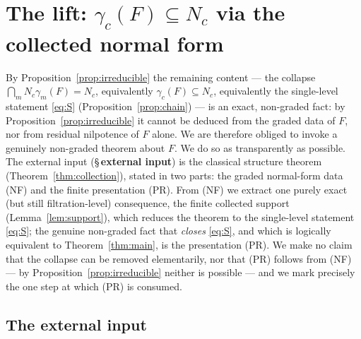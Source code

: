 \documentclass{amsart}
\theoremstyle{definition}
\theoremstyle{remark}
\begin{document}
\section{The lift: $\gamma_c(F)\subseteq N_c$ via the collected normal form}
\label{sec:lift}

By Proposition~\ref{prop:irreducible} the remaining content --- the collapse
$\bigcap_m N_c\gamma_m(F)=N_c$, equivalently $\gamma_c(F)\subseteq N_c$, equivalently the
single-level statement \eqref{eq:S} (Proposition~\ref{prop:chain}) --- is an exact,
non-graded fact: by Proposition~\ref{prop:irreducible} it cannot be deduced from the graded
data of $F$, nor from residual nilpotence of $F$ alone. We are therefore obliged to invoke a
genuinely non-graded theorem about $F$. We do so as transparently as possible. The external
input (\S\,\textbf{external input}) is the classical structure theorem
\textup{(Theorem~\ref{thm:collection})}, stated in two parts: the graded normal-form data
\textup{(NF)} and the finite presentation \textup{(PR)}. From (NF) we extract one purely exact
(but still filtration-level) consequence, the finite collected support
\textup{(Lemma~\ref{lem:support})}, which reduces the theorem to the single-level statement
\eqref{eq:S}; the genuine non-graded fact that \emph{closes} \eqref{eq:S}, and which is
logically equivalent to Theorem~\ref{thm:main}, is the presentation \textup{(PR)}. We make no
claim that the collapse can be removed elementarily, nor that (PR) follows from (NF) --- by
Proposition~\ref{prop:irreducible} neither is possible --- and we mark precisely the one step
at which (PR) is consumed.

\subsection*{The external input}
\end{document}
